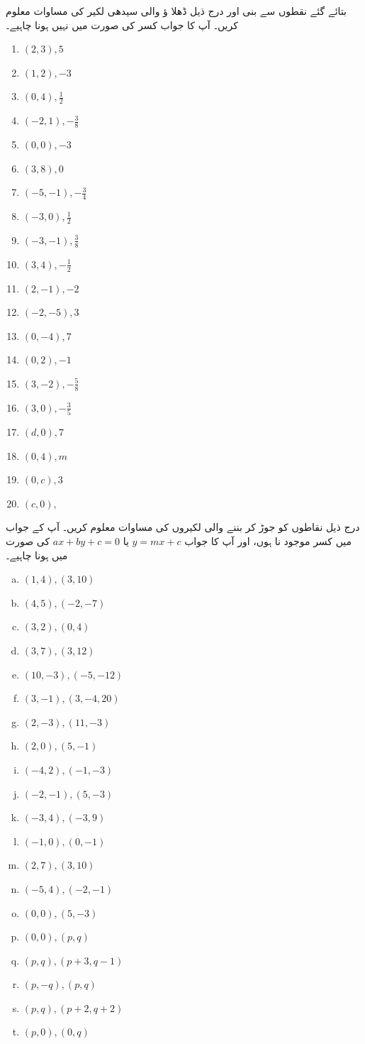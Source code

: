 بتائے گئے نقطوں سے بنی اور درج ذیل ڈھلا ؤ   والی سیدھی لکیر کی مساوات معلوم کریں۔ آپ کا جواب کسر کی صورت میں نہیں ہونا چاہیے۔
\begin{multicols}{4}
\begin{enumerate}[.a]
\item \((2,3), 5\)
\item \((1,2), -3\)
\item \((0,4),\frac{1}{2}\)
\item \((-2,1),-\frac{3}{8}\)
\item \((0,0),-3\)
\item \((3,8), 0\)
\item \((-5,-1),-\frac{3}{4}\)
\item \((-3,0), \frac{1}{2}\)
\item \((-3, -1),\frac{3}{8}\)
\item \((3,4),-\frac{1}{2}\)
\item \((2,-1),-2\)
\item \((-2,-5), 3\)
\item \((0,-4), 7\)
\item \((0,2),-1\)
\item \((3,-2), -\frac{5}{8}\)
\item \((3,0), -\frac{3}{5}\)
\item \((d,0),7\)
\item \((0,4),m\)
\item \((0,c),3\)
\item \((c,0),\)
\end{enumerate}
\end{multicols}
درج ذیل نقاطوں کو جوڑ کر بننے والی لکیروں کی مساوات معلوم کریں۔ آپ کے جواب میں کسر موجود نا ہوں، اور آپ کا جواب \(y=mx+c  \)    یا   \(ax+by+c=0\) کی صورت میں ہونا چاہیے۔
\begin{multicols}{3}
\begin{enumerate}[a.]
\item \((1,4),(3,10)\)
\item \((4,5),(-2,-7)\)
\item \((3,2),(0,4)\)
\item \((3,7),(3,12)\)
\item \((10,-3),(-5,-12)\)
\item \((3,-1),(3,-4,20)\)
\item \((2,-3),(11,-3)\)
\item \((2,0),(5,-1)\)
\item \((-4,2),(-1,-3)\)
\item \((-2,-1),(5,-3)\)
\item \((-3,4),(-3,9)\)
\item \((-1,0),(0,-1)\)
\item \((2,7),(3,10)\)
\item \((-5,4),(-2,-1)\)
\item \((0,0),(5,-3)\)
\item \((0,0),(p,q)\)
\item \((p,q),(p+3,q-1)\)
\item \((p,-q),(p,q)\)
\item \((p,q),(p+2,q+2)\)
\item \((p,0),(0,q)\)
\end{enumerate}
\end{multicols}
